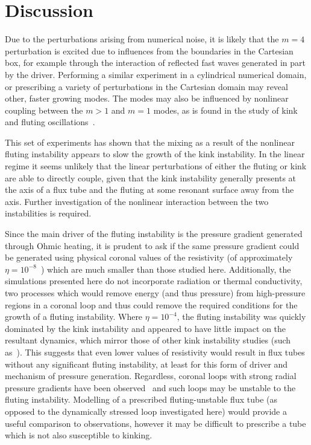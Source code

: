 \section{Discussion}

Due to the perturbations arising from numerical noise, it is likely that the $m=4$ perturbation is excited due to influences from the boundaries in the Cartesian box, for example through the interaction of reflected fast waves generated in part by the driver. Performing a similar experiment in a cylindrical numerical domain, or prescribing a variety of perturbations in the Cartesian domain may reveal other, faster growing modes. The modes may also be influenced by nonlinear coupling between the $m>1$ and $m=1$ modes, as is found in the study of kink and fluting oscillations~\cite{terradasEffectMagneticTwist2018,rudermanNonlinearGenerationFluting2017a}.

This set of experiments has shown that the mixing as a result of the nonlinear fluting instability appears to slow the growth of the kink instability. In the linear regime it seems unlikely that the linear perturbations of either the fluting or kink are able to directly couple, given that the kink instability generally presents at the axis of a flux tube and the fluting at some resonant surface away from the axis. Further investigation of the nonlinear interaction between the two instabilities is required.

Since the main driver of the fluting instability is the pressure gradient generated through Ohmic heating, it is prudent to ask if the same pressure gradient could be generated using physical coronal values of the resistivity (of approximately $\eta=10^{-8}$~\cite{craigAnisotropicViscousDissipation2009a}) which are much smaller than those studied here. Additionally, the simulations presented here do not incorporate radiation or thermal conductivity, two processes which would remove energy (and thus pressure) from high-pressure regions in a coronal loop and thus could remove the required conditions for the growth of a fluting instability. Where $\eta=10^{-4}$, the fluting instability was quickly dominated by the kink instability and appeared to have little impact on the resultant dynamics, which mirror those of other kink instability studies (such as~\cite{hoodCoronalHeatingMagnetic2009}). This suggests that even lower values of resistivity would result in flux tubes without any significant fluting instability, at least for this form of driver and mechanism of pressure generation. Regardless, coronal loops with strong radial pressure gradients have been observed~\cite{foukalTemperatureStructurePressure1975} and such loops may be unstable to the fluting instability. Modelling of a prescribed fluting-unstable flux tube (as opposed to the dynamically stressed loop investigated here) would provide a useful comparison to observations, however it may be difficult to prescribe a tube which is not also susceptible to kinking. 

